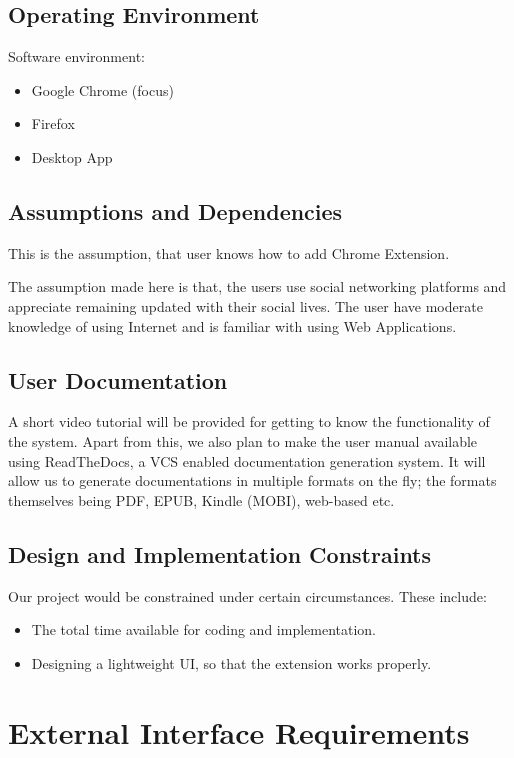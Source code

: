 \documentclass[12pt]{article}
\begin{document}
\subsection{Operating Environment}
Software environment:
\begin{itemize}
    \item Google Chrome (focus)
    \item Firefox
    \item Desktop App
\end{itemize}

\subsection{Assumptions and Dependencies}
This is the assumption, that user knows how to add Chrome Extension.

The assumption made here is that, the users use social networking platforms and appreciate remaining updated with their social lives. The user have moderate knowledge of using Internet and
is familiar with using Web Applications.

\subsection{User Documentation}
A short video tutorial will be provided for getting to know the functionality of the system. Apart from this, we also plan to make the user manual available using ReadTheDocs, a VCS enabled documentation generation system. It will allow us to generate documentations in multiple formats on the fly; the formats themselves being PDF, EPUB, Kindle (MOBI), web-based etc.

\subsection{Design and Implementation Constraints}
Our project would be constrained under certain circumstances. These
include:
\begin{itemize}
    \item  The total time available for coding and implementation.

    \item Designing a lightweight UI, so that the extension works properly.
\end{itemize}

\section{External Interface Requirements}
\end{document}
